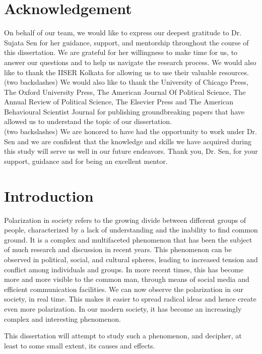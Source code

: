 \documentclass{article}
\begin{document}
\section{Acknowledgement}
On behalf of our team, we would like to express our deepest gratitude to Dr. Sujata Sen for her guidance, support, and mentorship throughout the course of this dissertation. We are grateful for her willingness to make time for us, to answer our questions and to help us navigate the research process. We would also like to thank the IISER Kolkata for allowing us to use their valuable resources.
    \\ (two backslashes)
    \newline
    \hfill \break
We would also like to thank the University of Chicago Press, The Oxford University Press, The American Journal Of Political Science, The Annual Review of Political Science, The Elsevier Press and The American Behavioural Scientist Journal for publishing groundbreaking papers that have allowed us to understand the topic of our dissertation.
\\ (two backslashes)
    \newline
    \hfill \break
We are honored to have had the opportunity to work under Dr. Sen and we are confident that the knowledge and skills we have acquired during this study will serve us well in our future endeavors. Thank you, Dr. Sen, for your support, guidance and for being an excellent mentor.
\newpage
\section{Introduction}
Polarization in society refers to the growing divide between different groups of people, characterized by a lack of understanding and the inability to find common ground. It is a complex and multifaceted phenomenon that has been the subject of much research and discussion in recent years. This phenomenon can be observed in political, social, and cultural spheres, leading to increased tension and conflict among individuals and groups. 
In more recent times, this has become more and more visible to the common man, through means of social media and efficient communication facilities. We can now observe the polarization in our society, in real time. This makes it easier to spread radical ideas and hence create even more polarization. In our modern society, it has become an increasingly complex and interesting phenomenon.

This dissertation will attempt to study such a phenomenon, and decipher, at least to some small extent, its causes and effects. 
\end{document}
